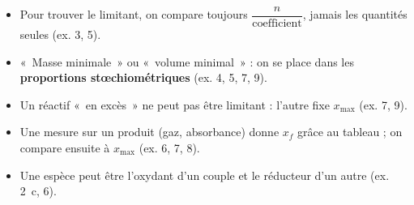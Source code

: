 \documentclass[11pt,a4paper]{article}
\begin{document}
\vfill
\begin{tcolorbox}[colback=bleu!6,colframe=bleu,boxrule=0.6pt,arc=2pt,fonttitle=\bfseries,title={Les réflexes à retenir de cette feuille}]
\begin{itemize}
  \item Pour trouver le limitant, on compare toujours $\dfrac{n}{\text{coefficient}}$, jamais les quantités seules (ex. 3, 5).
  \item «~Masse minimale~» ou «~volume minimal~» : on se place dans les \textbf{proportions stœchiométriques} (ex. 4, 5, 7, 9).
  \item Un réactif «~en excès~» ne peut pas être limitant : l'autre fixe $x_{\max}$ (ex. 7, 9).
  \item Une mesure sur un produit (gaz, absorbance) donne $x_f$ grâce au tableau ; on compare ensuite à $x_{\max}$ (ex. 6, 7, 8).
  \item Une espèce peut être l'oxydant d'un couple et le réducteur d'un autre (ex. 2~c, 6).
\end{itemize}
\end{tcolorbox}
\end{document}

